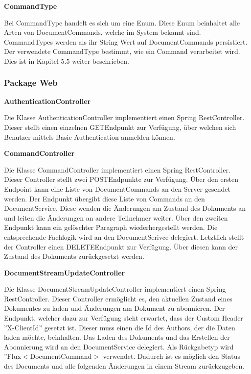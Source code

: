 \textbf{CommandType}

Bei CommandType handelt es sich um eine Enum.
Diese Enum beinhaltet alle Arten von DocumentCommands, welche im System bekannt sind.
CommandTypes werden als ihr String Wert auf DocumentCommands persistiert.
Der verwendete CommandType bestimmt, wie ein Command verarbeitet wird.
Dies ist in Kapitel 5.5 weiter beschrieben.

\subsubsection{Package Web}

\textbf{AuthenticationController}

Die Klasse AuthenticationController implementiert einen Spring RestController.
Dieser stellt einen einzelnen GET\-Endpunkt zur Verfügung, über welchen sich Benutzer mittels Basic Authentication anmelden können.

\textbf{CommandController}

Die Klasse CommandController implementiert einen Spring RestController.
Dieser Controller stellt zwei POST\-Endpunkte zur Verfügung.
Über den ersten Endpoint kann eine Liste von DocumentCommands an den Server gesendet werden.
Der Endpunkt übergibt diese Liste von Commands an den DocumentService.
Diese wenden die Änderungen am Zustand des Dokuments an und leiten die Änderungen an andere Teilnehmer weiter.
Über den zweiten Endpunkt kann ein gelöschter Paragraph wiederhergestellt werden.
Die entsprechende Fachlogik wird an den DocumentSerivce delegiert.
Letztlich stellt der Controller einen DELETE\-Endpunkt zur Verfügung.
Über diesen kann der Zustand des Dokuments zurückgesetzt werden.

\textbf{DocumentStreamUpdateController}

Die Klasse DocumentStreamUpdateController implementiert einen Spring RestController.
Dieser Controller ermöglicht es, den aktuellen Zustand eines Dokumentes zu laden und Änderungen am Dokument zu abonnieren.
Der Endpunkt, welcher dazu zur Verfügung steht erwartet, dass der Custom Header ''X-ClientId'' gesetzt ist.
Dieser muss einen die Id des Authors, der die Daten laden möchte, beinhalten.
Das Laden des Dokuments und das Erstellen der Abonnierung wird an den DocumentService delegiert.
Als Rückgabetyp wird ''Flux$<$DocumentCommand$>$ verwendet.
Dadurch ist es möglich den Status des Documents und alle folgenden Änderungen in einem Stream zurückzugeben.

\clearpage

